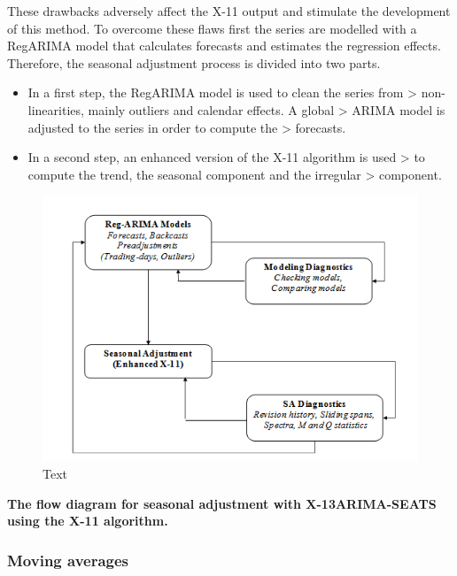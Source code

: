 \documentclass[
  letterpaper,
  DIV=11,
  numbers=noendperiod]{scrreprt}
\begin{document}
These drawbacks adversely affect the X-11 output and stimulate the
development of this method. To overcome these flaws first the series are
modelled with a RegARIMA model that calculates forecasts and estimates
the regression effects. Therefore, the seasonal adjustment process is
divided into two parts.

\begin{itemize}
\item
  In a first step, the RegARIMA model is used to clean the series from
  \textgreater{} non-linearities, mainly outliers and calendar effects.
  A global \textgreater{} ARIMA model is adjusted to the series in order
  to compute the \textgreater{} forecasts.
\item
  In a second step, an enhanced version of the X-11 algorithm is used
  \textgreater{} to compute the trend, the seasonal component and the
  irregular \textgreater{} component.
\end{itemize}

\begin{figure}

{\centering \includegraphics{./All_images/UG_A_image13.png}

}

\caption{Text}

\end{figure}

\textbf{The flow diagram for seasonal adjustment with X-13ARIMA-SEATS
using the X-11 algorithm.}

\hypertarget{moving-averages}{%
\subsubsection{Moving averages}\label{moving-averages}}
\end{document}
